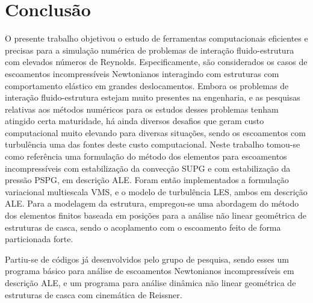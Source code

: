 \chapter{Conclusão} \label{Conclusao}

O presente trabalho objetivou o estudo de ferramentas computacionais eficientes e precisas para a simulação numérica de problemas de interação fluido-estrutura com elevados números de Reynolds. Especificamente, são considerados os casos de escoamentos incompressíveis Newtonianos interagindo com estruturas com comportamento elástico em grandes deslocamentos. Embora os problemas de interação fluido-estrutura estejam muito presentes na engenharia, e as pesquisas relativas aos métodos numéricos para os estudos desses problemas tenham atingido certa maturidade, há ainda diversos desafios que geram custo computacional muito elevando para diversas situações, sendo os escoamentos com turbulência uma das fontes deste custo computacional. Neste trabalho tomou-se como referência uma formulação do método dos elementos para escoamentos incompressíveis com estabilização da convecção SUPG e com estabilização da pressão PSPG, em descrição ALE. Foram então implementados a formulação variacional multiescala VMS, e o modelo de turbulência LES, ambos em descrição ALE. Para a modelagem da estrutura, empregou-se uma abordagem do método dos elementos finitos baseada em posições para a análise não linear geométrica de estruturas de casca, sendo o acoplamento com o escoamento feito de forma particionada forte.

Partiu-se de códigos já desenvolvidos pelo grupo de pesquisa, sendo esses um programa básico para análise de escoamentos Newtonianos incompressíveis em descrição ALE, e um programa para análise dinâmica não linear geométrica de estruturas de casca com cinemática de Reissner.

